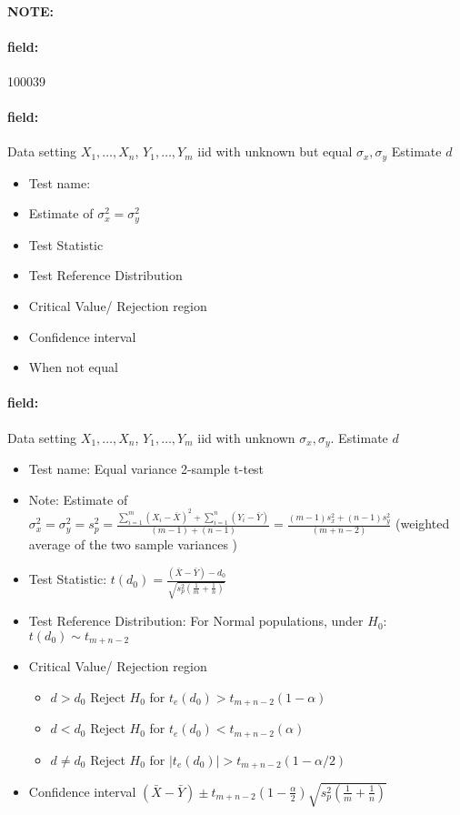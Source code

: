 \documentclass[12pt]{article}
\newenvironment{note}{\paragraph{NOTE:}}{}
\newenvironment{field}{\paragraph{field:}}{}
\begin{document}
\begin{note} \begin{field} \tiny 100039 \end{field}
 \begin{field}
  Data setting $X_1, \ldots , X_n$, $Y_1, \ldots, Y_m$ iid with unknown but equal  $\sigma_x, \sigma_y$ Estimate $d$
  \begin{itemize}
   \item Test name:
   \item Estimate of $\sigma_x^2 = \sigma_y^2$
   \item Test Statistic
   \item Test Reference Distribution
   \item Critical Value/ Rejection region
   \item Confidence interval
   \item When not equal
  \end{itemize}
 \end{field}
 \begin{field}
  Data setting $X_1, \ldots , X_n$, $Y_1, \ldots, Y_m$ iid with unknown $\sigma_x, \sigma_y$. Estimate $d$
  \begin{itemize}
   \item Test name: Equal variance 2-sample t-test
   \item Note: Estimate of $\sigma_x^2 = \sigma_y^2 = s_p^2 = \frac{\sum_{i=1}^m (X_i - \bar{X})^2 + \sum_{i=1}^n (Y_i - \bar{Y})}{(m-1) + (n-1)} = \frac{(m-1)s_x^2 + (n-1)s_y^2}{(m+n-2)}$ (weighted average of the two sample variances )
   \item Test Statistic: $t(d_0) = \frac{(\bar{X} - \bar{Y}) - d_0}{\sqrt{s_p^2(\frac{1}{m} + \frac{1}{n})}}$
   \item Test Reference Distribution: For Normal populations, under $H_0$: $t(d_0) \sim t_{m+n-2}$
   \item Critical Value/ Rejection region
         \begin{itemize}
          \item $d > d_0$ Reject $H_0$ for $t_e(d_0) > t_{m+n-2}(1 - \alpha)$
          \item $d < d_0$ Reject $H_0$ for $t_e(d_0) < t_{m+n-2}(\alpha)$
          \item $d \neq d_0$ Reject $H_0$ for $|t_e(d_0)| > t_{m+n-2}(1 - \alpha/2)$
         \end{itemize}
   \item Confidence interval $ (\bar{X} - \bar{Y}) \pm t_{m+n-2}(1 - \frac{\alpha}{2})\sqrt{s_p^2(\frac{1}{m} + \frac{1}{n})}$

\end{itemize}
\end{field}
\end{note}
\end{document}
